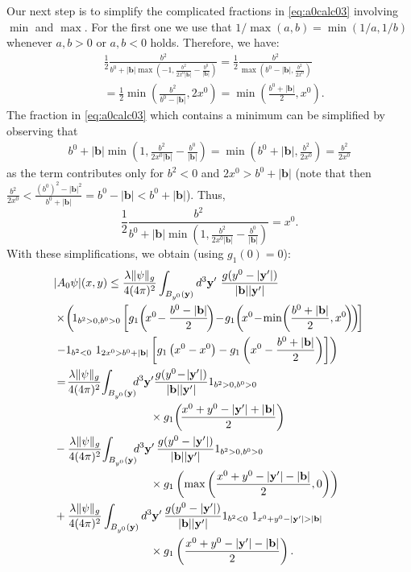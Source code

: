 \documentclass[b5paper,draft,openbib,12pt]{memoir}
\newcommand{\vy}{\mathbf{y}}
\newcommand{\vb}{\mathbf{b}}
\begin{document}
Our next step is to simplify the complicated fractions 
in \eqref{eq:a0calc03} involving $\min$ and $\max$. 
For the first one we use that 
\(1/\max(a,b)=\min(1/a,1/b)\) whenever \(a,b>0\) or 
\(a,b<0\) holds. Therefore, we have:
\begin{align}
    &\frac{1}{2}\frac{b^2}{b^0+|\vb|\max\left( -1,\frac{b^2}{2x^0|\vb|} - \frac{b^0}{|\vb|}\right)}
	= \frac{1}{2} \frac{b^2}{\max\left(b^0-|\vb|,\frac{b^2}{2x^0}\right)}\nonumber\\
    &= \frac{1}{2} \min \left(\frac{b^2}{b^0-|\vb|}, 2x^0 \right)\nonumber
    = \min \left( \frac{b^0+|\vb|}{2}, x^0 \right).
\end{align}
The fraction in \eqref{eq:a0calc03} which contains a 
minimum can be simplified by observing that
\begin{align}
    b^0+|\vb|\min\left(1,\frac{b^2}{2x^0|\vb|}-\frac{b^0}{|\vb|}\right) = \min \left( b^0+|\vb|, \frac{b^2}{2x^0} \right)= \frac{b^2}{2x^0}
\end{align}
as the term contributes only for \(b^2<0\) and 
$2x^0>b^0+|\vb|$ (note that then $\frac{b^2}{2x^0} 
< \frac{(b^0)^2-|\vb|^2}{b^0 + |\vb|} = b^0 - |\vb| 
< b^0 + |\vb|$). Thus,
\begin{equation}
	\frac{1}{2} \frac{b^2}{b^0+|\vb| \min(1, \frac{b^2}{2x^0|\vb|}-\frac{b^0}{|\vb|})} = x^0.
\end{equation}
With these simplifications, we obtain (using 
$g_1(0)=0$):
\begin{align}
    &|A_0\psi|(x,y) \le  \frac{\lambda \|\psi\|_g}{4(4\pi)^2} \int_{B_{y^0}(\vy)}d^3\vy'~ \frac{g(y^0-|\vy'|)}{|\vb||\vy'|} \nonumber\\
    &\times \!\left(\!1_{b^2>0,b^0>0} \left[g_1\!\left(\!x^0\!-\frac{b^0-|\vb|}{2} \!\right)\! -\! g_1\!\left(\! x^0 \!- \!\min\!\left(\frac{b^0+|\vb|}{2},x^0\!\right)\!\right)\!\right]\right.\nonumber\\
    &\left. -1_{b^2<0}~1_{2x^0>b^0+|\vb|}\left[
    g_1\left(x^0-x^0\right)- g_1\left(x^0-\frac{b^0+|\vb|}{2} \right)\right]\right)\nonumber\\\label{y'Integral1}
    &=\!\frac{\lambda \|\psi\|_g}{4(4\pi)^2} \!\int_{B_{y^0}(\vy)}\!\!\!d^3\vy' \frac{g(y^0\!-\!|\vy'|)}{|\vb||\vy'|}
    1_{b^2>0,b^0>0} \notag\\
    &\hspace{3cm} \times g_1\!\left(\!\frac{x^0+y^0-|\vy'|+|\vb|}{2} \right) \\\label{y'Integral2}
    &-\frac{\lambda \|\psi\|_g}{4(4\pi)^2}\! \int_{B_{y^0}(\vy)}\!\!\!d^3\vy' \, \frac{g(y^0-|\vy'|)}{|\vb||\vy'|}
    1_{b^2>0,b^0>0}\notag\\
    &\hspace{3cm} \times   g_1\left( \max\left(\frac{x^0+y^0-|\vy'|-|\vb|}{2},0\right)\right)\\\label{y'Integral3}
    & +\frac{\lambda \|\psi\|_g}{4(4\pi)^2} \int_{B_{y^0}(\vy)}d^3\vy' \, \frac{g(y^0-|\vy'|)}{|\vb||\vy'|} 1_{b^2<0}~1_{x^0+y^0-|\vy'|>|\vb|}\notag\\
    &\hspace{3cm} \times g_1\left(\frac{x^0+y^0-|\vy'|-|\vb|}{2} \right).
\end{align}
\end{document}
